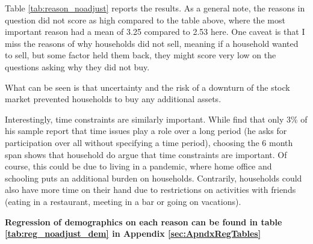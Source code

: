 \documentclass[ProjectABM]{subfiles}
\begin{document}


Table \ref{tab:reason_noadjust} reports the results. As a general note, the reasons in question did not score as high compared to the table above, where the most important reason had a mean of 3.25 compared to 2.53 here. %
One caveat is that I miss the reasons of why households did not sell, meaning if a household wanted to sell, but some factor held them back, they might score very low on the questions asking why they did not buy.

What can be seen is that uncertainty and the risk of a downturn of the stock market prevented households to buy any additional assets. %

Interestingly, time constraints are similarly important. While \cite{choi_2020} find that only 3\% of his sample report that time issues play a role over a long period (he asks for participation over all without specifying a time period), choosing the 6 month span shows that household do argue that time constraints are important. Of course, this could be due to living in a pandemic, where home office and schooling puts an additional burden on households. Contrarily, households could also have more time on their hand due to restrictions on activities with friends (eating in a restaurant, meeting in a bar or going on vacations).

\textbf{Regression of demographics on each reason can be found in table \ref{tab:reg_noadjust_dem} in Appendix \ref{sec:ApndxRegTables} }

\end{document}
